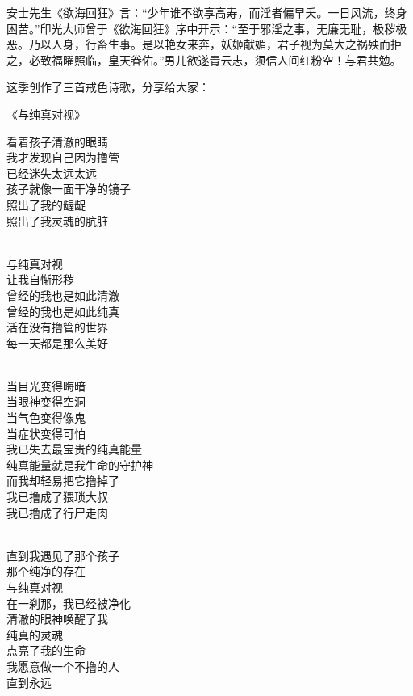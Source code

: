安士先生《欲海回狂》言：“少年谁不欲享高寿，而淫者偏早夭。一日风流，终身困苦。”印光大师曾于《欲海回狂》序中开示：“至于邪淫之事，无廉无耻，极秽极恶。乃以人身，行畜生事。是以艳女来奔，妖姬献媚，君子视为莫大之祸殃而拒之，必致福曜照临，皇天眷佑。”男儿欲遂青云志，须信人间红粉空！与君共勉。

这季创作了三首戒色诗歌，分享给大家：

\begin{center}
    《与纯真对视》\it
    \begin{multicols}{2}
        看着孩子清澈的眼睛 \\ 我才发现自己因为撸管 \\ 已经迷失太远太远 \\ 孩子就像一面干净的镜子 \\ 照出了我的龌龊 \\ 照出了我灵魂的肮脏

        ~\\

        与纯真对视 \\ 让我自惭形秽 \\ 曾经的我也是如此清澈 \\ 曾经的我也是如此纯真 \\ 活在没有撸管的世界 \\ 每一天都是那么美好

        ~\\

        当目光变得晦暗 \\ 当眼神变得空洞 \\ 当气色变得像鬼 \\ 当症状变得可怕 \\ 我已失去最宝贵的纯真能量 \\ 纯真能量就是我生命的守护神 \\ 而我却轻易把它撸掉了 \\ 我已撸成了猥琐大叔 \\ 我已撸成了行尸走肉

        ~\\

        直到我遇见了那个孩子 \\ 那个纯净的存在 \\ 与纯真对视 \\ 在一刹那，我已经被净化 \\ 清澈的眼神唤醒了我 \\ 纯真的灵魂 \\ 点亮了我的生命 \\ 我愿意做一个不撸的人 \\ 直到永远
    \end{multicols}
\end{center}

